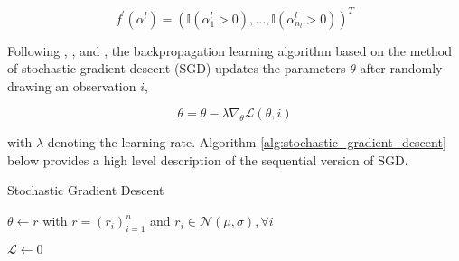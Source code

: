 
\begin{equation}
    f^{'}(\alpha^{l}) = ( \mathbb{I}(\alpha^{l}_{1} > 0), ..., \mathbb{I}(\alpha^{l}_{ n_{l} } > 0) )^{T}
\end{equation}

Following \cite{rojas1996neuralNetworks}, \cite{ruder2016gradientDescent}, and \cite{dixon2015annMarketPrediction},
the backpropagation learning algorithm based on the method of stochastic gradient descent (SGD) updates 
the parameters $ \theta $ after randomly drawing an observation $i$,

\begin{equation}
    \theta = \theta - \lambda \nabla_{ \theta } \mathscr{L}( \theta, i )
\end{equation}

with $\lambda$ denoting the learning rate.
Algorithm \ref{alg:stochastic_gradient_descent} below provides a high level description of the sequential version of
SGD.

\begin{algorithm}[H]
    \caption{ Stochastic Gradient Descent \cite{dixon2015annMarketPrediction} }




    $ \theta \leftarrow r $ with $ r = (r_{i})_{i=1}^{n}  $ and $ r_{i} \in \mathscr{N}( \mu, \sigma ), \forall i $


    $ \mathscr{L} \leftarrow 0 $



    \label{alg:stochastic_gradient_descent}
\end{algorithm}


